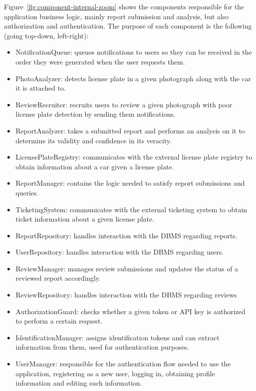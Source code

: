 Figure~\ref{fig:component-internal-zoom} shows the components responsible for the application business logic, mainly report submission and analysis, but also authorization and authentication.
The purpose of each component is the following (going top-down, left-right):
\begin{itemize}
    \item NotificationQueue: queues notifications to users so they can be received in the order they were generated when the user requests them.
    \item PhotoAnalyzer: detects license plate in a given photograph along with the car it is attached to.
    \item ReviewRecruiter: recruits users to review a given photograph with poor license plate detection by sending them notifications.
    \item ReportAnalyzer: takes a submitted report and performs an analysis on it to determine its validity and confidence in its veracity. 
    \item LicensePlateRegistry: communicates with the external license plate registry to obtain information about a car given a license plate.
    \item ReportManager: contains the logic needed to satisfy report submissions and queries.
    \item TicketingSystem: communicates with the external ticketing system to obtain ticket information about a given license plate.
    \item ReportRepository: handles interaction with the DBMS regarding reports.
    \item UserRepository: handles interaction with the DBMS regarding users.
    \item ReviewManager: manages review submissions and updates the status of a reviewed report accordingly.
    \item ReviewRepository: handles interaction with the DBMS regarding reviews
    \item AuthorizationGuard: checks whether a given token or API key is authorized to perform a certain request.
    \item IdentificationManager: assigns identification tokens and can extract information from them, used for authentication purposes.
    \item UserManager: responsible for the authentication flow needed to use the application, registering as a new user, logging in, obtaining profile information and editing such information.
\end{itemize}

